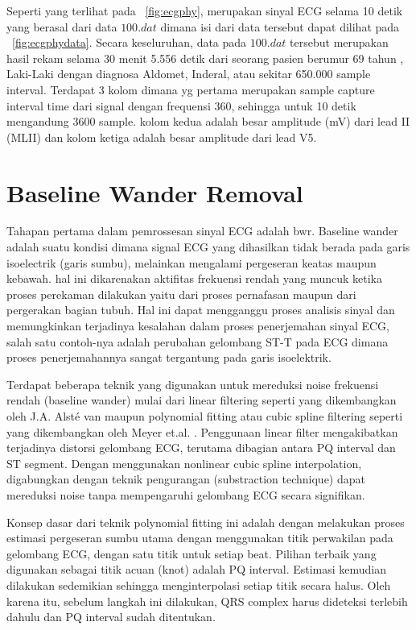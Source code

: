 Seperti yang terlihat pada \pic~\ref{fig:ecgphy}, merupakan sinyal ECG selama
10 detik yang berasal dari data $100.dat$ dimana isi dari data tersebut dapat
dilihat pada \pic~\ref{fig:ecgphydata}. Secara keseluruhan, data pada $100.dat$
tersebut merupakan hasil rekam selama 30 menit 5.556 detik dari seorang pasien
berumur 69 tahun , Laki-Laki dengan diagnosa Aldomet, Inderal, atau sekitar
650.000 sample interval. Terdapat 3 kolom dimana yg pertama merupakan sample
capture interval time dari signal dengan frequensi 360, sehingga untuk 10 detik
mengandung 3600 sample. kolom kedua adalah besar amplitude (mV) dari lead II
(MLII) dan kolom ketiga adalah besar amplitude dari lead V5.

\section{Baseline Wander Removal}
Tahapan pertama dalam pemrossesan sinyal ECG adalah \gls{bwr}. Baseline wander
adalah suatu kondisi dimana signal ECG yang dihasilkan tidak berada pada garis
isoelectrik (garis sumbu), melainkan mengalami pergeseran keatas maupun
kebawah. hal ini dikarenakan aktifitas frekuensi rendah yang muncuk ketika 
proses perekaman dilakukan yaitu dari proses pernafasan maupun dari pergerakan
bagian tubuh. Hal ini dapat mengganggu proses analisis sinyal dan memungkinkan
terjadinya kesalahan dalam proses penerjemahan sinyal ECG,  salah satu
contoh-nya adalah perubahan gelombang ST-T pada ECG dimana  proses
penerjemahannya sangat tergantung pada garis isoelektrik.

Terdapat beberapa teknik yang digunakan untuk mereduksi noise frekuensi rendah
(baseline wander) mulai dari linear filtering seperti yang dikembangkan oleh
J.A. {Alst\'{e}} van \cite{alst-1986} maupun polynomial fitting atau cubic
spline filtering seperti yang dikembangkan oleh Meyer et.al. \cite{meyer-1977}.
Penggunaan linear filter mengakibatkan terjadinya distorsi gelombang ECG,
terutama dibagian antara PQ interval dan ST segment. Dengan menggunakan
nonlinear cubic spline interpolation, digabungkan dengan teknik pengurangan
(substraction technique) dapat mereduksi noise tanpa mempengaruhi gelombang ECG
secara signifikan.

Konsep dasar dari teknik polynomial fitting ini adalah dengan melakukan proses
estimasi pergeseran sumbu utama dengan menggunakan titik perwakilan pada
gelombang ECG, dengan satu titik untuk setiap beat. Pilihan terbaik yang
digunakan sebagai titik acuan (knot) adalah PQ interval. Estimasi kemudian
dilakukan sedemikian sehingga menginterpolasi setiap titik secara halus. Oleh
karena itu, sebelum langkah ini dilakukan, QRS complex harus dideteksi  terlebih
dahulu dan PQ interval sudah ditentukan.

